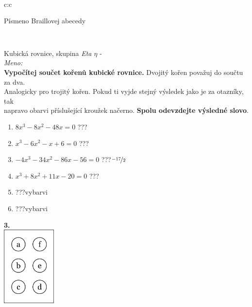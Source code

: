 \documentclass[10pt]{report}
\begin{document}
\begin{tabular}{c:c}
\begin{minipage}[c][99mm][t]{0.49\linewidth}
\begin{center}
\begin{minipage}{0.20\linewidth}
\begin{center}
{\small Písmeno Braillovej abecedy}
\end{center}
\end{minipage}
\end{center}
\end{minipage}
\\ \hdashline
\begin{minipage}[c][99mm][t]{0.49\linewidth}
\begin{center}
\vspace{7mm}
{\huge Kubická rovnice, skupina \textit{Eta $\eta$} -}\\[4.5mm]
\textit{Meno:}\phantom{xxxxxxxxxxxxxxxxxxxxxxxxxxxxxxxxxxxxxxxxxxxxxxxxxxxxxxxxxxxxxxxxx}\\[3.5mm]
\textbf{Vypočítej součet kořenů kubické rovnice.} Dvojitý kořen považuj do součtu za dva.\\Analogicky pro trojitý kořen. Pokud ti vyjde stejný výsledek jako je za otazníky, tak\\napravo obarvi příslušející kroužek načerno. \textbf{Spolu odevzdejte výsledné slovo}.\\[3mm]
\begin{minipage}{0.77\linewidth}
\begin{center}
\begin{varwidth}{\textwidth}
\begin{enumerate}
\large
\item $8x^3-8x^2-48x=0$\quad \dotfill\; ???\;\dotfill {}
\item $x^3-6x^2-x+6=0$\quad \dotfill\; ???\;\dotfill {}
\item $-4x^3-34x^2-86x-56=0$\quad \dotfill\; ???\;\dotfill \quad $\nicefrac{-17}{2}$
\item $x^3+8x^2+11x-20=0$\quad \dotfill\; ???\;\dotfill {}
\item \quad \dotfill\; ???\;\dotfill \quad vybarvi
\item \quad \dotfill\; ???\;\dotfill \quad vybarvi
\end{enumerate}
\end{varwidth}
\end{center}
\end{minipage}
\begin{minipage}{0.20\linewidth}
\begin{center}
{\Huge\bfseries 3.} \\[2mm]
\includegraphics[height=40mm]{../images/braille.png}

\end{center}
\end{minipage}
\end{center}
\end{minipage}
\end{tabular}
\end{document}
